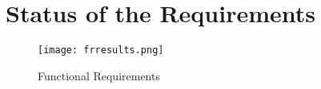 \tocless\chapter{Status of the Requirements}
\begin{figure}[H]
	\centering
	\texttt{[image: frresults.png]}
	\caption{Functional Requirements}
\end{figure}


\clearpage
\normalsize
{}

\begingroup
\pagestyle{plain}
\listoffigures
\listoftables
\endgroup







